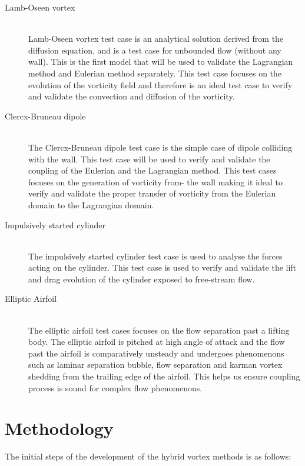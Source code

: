 	\begin{description}
	\item[Lamb-Oseen vortex] \cite{Lamb1993} \cite{Tryggeson2007} \hfill\\
	Lamb-Oseen vortex test case is an analytical solution derived from the diffusion equation, and is a test case for unbounded flow (without any wall). This is the first model that will be used to validate the Lagrangian method and Eulerian method separately. This test case focuses on the evolution of the vorticity field and therefore is an ideal test case to verify and validate the convection and diffusion of the vorticity.
	\item[Clercx-Bruneau dipole] \cite{Clercx2006}\hfill\\
	The Clercx-Bruneau dipole test case is the simple case of dipole colliding with the wall. This test case will be used to verify and validate the coupling of the Eulerian and the Lagrangian method. This test cases focuses on the generation of vorticity from- the wall making it ideal to verify and validate the proper transfer of vorticity from the Eulerian domain to the Lagrangian domain.
	\item[Impulsively started cylinder] \cite{LEONARD1995} \cite{Chang2006} \cite{Chassaing1986} \cite{Lecointe1985}\hfill\\
	The impulsively started cylinder test case is used to analyse the forces acting on the cylinder. This test case is used to verify and validate the lift and drag evolution of the cylinder exposed to free-stream flow.
	\item[Elliptic Airfoil] \cite{Nair1997}\hfill\\
	The elliptic airfoil test cases focuses on the flow separation past a lifting body. The elliptic airfoil is pitched at high angle of attack and the flow past the airfoil is comparatively unsteady and undergoes phenomenons such as laminar separation bubble, flow separation and karman vortex shedding from the trailing edge of the airfoil. This helps us ensure coupling process is sound for complex flow phenomenons.
	\end{description}

\section{Methodology}
The initial steps of the development of the hybrid vortex methods is as follows:

